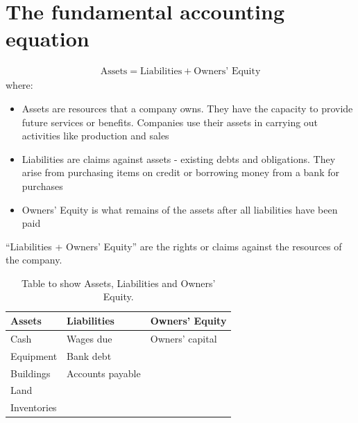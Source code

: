 \section{The fundamental accounting equation}
\begin{gather}
    \textrm{Assets} = \textrm{Liabilities} + \textrm{Owners' Equity}
\end{gather}
where:
\begin{itemize}
    \item Assets are resources that a company owns. They have the capacity to provide future services or benefits. Companies use their assets in carrying out activities like production and sales
    \item Liabilities are claims against assets - existing debts and obligations. They arise from purchasing items on credit or borrowing money from a bank for purchases
    \item Owners' Equity is what remains of the assets after all liabilities have been paid
\end{itemize}
``Liabilities + Owners' Equity'' are the rights or claims against the resources of the company.
\begin{table}[H]
    \centering
    \begin{tabular}{@{}lll@{}}
        \toprule
        \textbf{Assets} & \textbf{Liabilities} & \textbf{Owners' Equity} \\
        \midrule
        Cash            & Wages due            & Owners' capital         \\
        Equipment       & Bank debt            &                         \\
        Buildings       & Accounts payable     &                         \\
        Land            &                      &                         \\
        Inventories     &                      &                         \\
        \bottomrule
    \end{tabular}
    \caption{Table to show Assets, Liabilities and Owners' Equity.}
\end{table}
